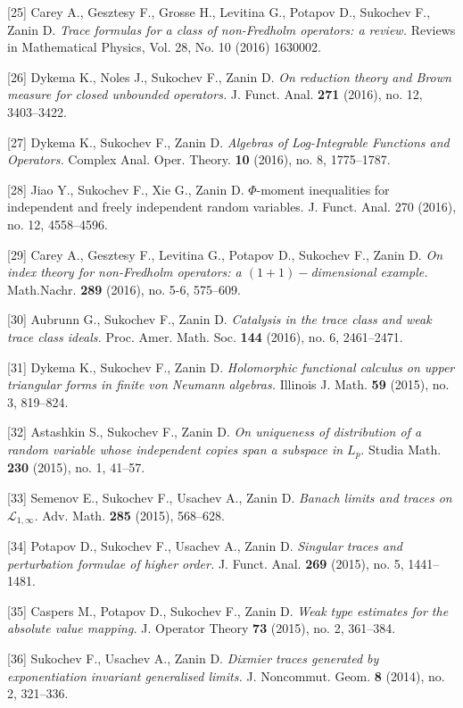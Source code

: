 \documentclass{article}
\begin{document}
[25] Carey A., Gesztesy F., Grosse H., Levitina G., Potapov D., Sukochev F., Zanin D. {\it Trace formulas for a class of non-Fredholm operators: a review.} Reviews in Mathematical Physics, Vol. 28, No. 10 (2016) 1630002.

[26] Dykema K., Noles J., Sukochev F., Zanin D. {\it On reduction theory and Brown measure for closed unbounded operators.} J. Funct. Anal. {\bf 271} (2016), no. 12, 3403--3422.

[27] Dykema K., Sukochev F., Zanin D. {\it Algebras of Log-Integrable Functions and Operators.} Complex Anal. Oper. Theory. {\bf 10} (2016), no. 8, 1775--1787.

[28] Jiao Y., Sukochev F., Xie G., Zanin D. $\Phi$-moment inequalities for independent and freely independent random variables.  J. Funct. Anal. 270 (2016), no. 12, 4558--4596.

[29] Carey A., Gesztesy F., Levitina G., Potapov D., Sukochev F., Zanin D. {\it On index theory for non-Fredholm operators: a $(1+1)-$dimensional example.} Math.Nachr. {\bf 289} (2016), no. 5-6, 575--609.

[30] Aubrunn G., Sukochev F., Zanin D. {\it Catalysis in the trace class and weak trace class ideals.} Proc. Amer. Math. Soc. {\bf 144} (2016), no. 6, 2461--2471.

[31] Dykema K., Sukochev F., Zanin D. {\it Holomorphic functional calculus on upper triangular forms in finite von Neumann algebras.} Illinois J. Math. {\bf 59} (2015), no. 3, 819--824.

[32] Astashkin S., Sukochev F., Zanin D. {\it On uniqueness of distribution of a random variable whose independent copies span a subspace in $L_p.$} Studia Math. {\bf 230} (2015), no. 1, 41--57.

[33] Semenov E., Sukochev F., Usachev A., Zanin D. {\it Banach limits and traces on $\mathcal{L}_{1,\infty}.$} Adv. Math. {\bf 285} (2015), 568--628.

[34] Potapov D., Sukochev F., Usachev A., Zanin D. {\it Singular traces and perturbation formulae of higher order.} J. Funct. Anal. {\bf 269} (2015), no. 5, 1441--1481.

[35] Caspers M., Potapov D., Sukochev F., Zanin D. {\it Weak type estimates for the absolute value mapping.} J. Operator Theory {\bf 73} (2015), no. 2, 361--384.

[36] Sukochev F., Usachev A., Zanin D. {\it Dixmier traces generated by exponentiation invariant generalised limits.} J. Noncommut. Geom. {\bf 8} (2014), no. 2, 321--336.
\end{document}
